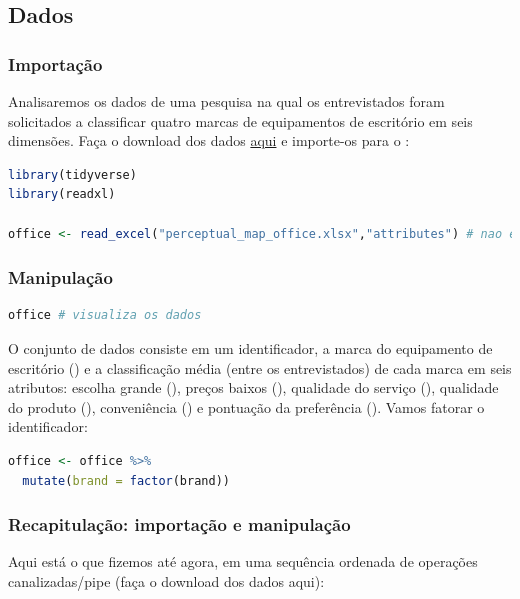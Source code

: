 \documentclass{article}
\begin{document}
\subsection{Dados}
\subsubsection{Importação}

Analisaremos os dados de uma pesquisa na qual os entrevistados foram solicitados a classificar quatro marcas de equipamentos de escritório em seis dimensões. Faça o download dos dados \href{http://users.telenet.be/samuelfranssens/tutorial_data/perceptual_map_office.xlsx}{aqui} e importe-os para o \faRProject:


\begin{lstlisting}[language=R]
library(tidyverse)
library(readxl)

office <- read_excel("perceptual_map_office.xlsx","attributes") # nao esqueca de carregar o pacote readxl

\end{lstlisting}

\subsubsection{Manipulação}


\begin{lstlisting}[language=R]
office # visualiza os dados
\end{lstlisting}

O conjunto de dados consiste em um identificador, a marca do equipamento de escritório () e a classificação média (entre os entrevistados) de cada marca em seis atributos: escolha grande (), preços baixos (), qualidade do serviço (), qualidade do produto (), conveniência () e pontuação da preferência (). Vamos fatorar o identificador:


\begin{lstlisting}[language=R]
office <- office %>% 
  mutate(brand = factor(brand))
\end{lstlisting}


\subsubsection{Recapitulação: importação e manipulação}

Aqui está o que fizemos até agora, em uma sequência ordenada de operações canalizadas/pipe (faça o download dos dados aqui):
\end{document}
